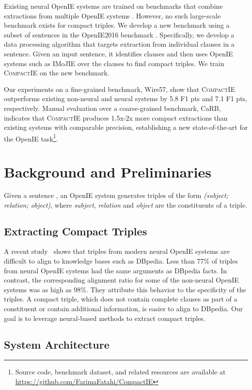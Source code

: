 \documentclass[11pt,a4paper]{article}
\newcommand{\system}{{\textsc{CompactIE}}}
\begin{document}
Existing neural OpenIE systems are trained on benchmarks that combine extractions from multiple OpenIE systems .
However, no such large-scale benchmark exists for compact triples. We develop a new benchmark using a subset of sentences in the OpenIE2016 benchmark \cite{openie4}. Specifically, we develop a data processing algorithm that targets extraction from individual clauses in a sentence. Given an input sentence, it identifies clauses and then uses OpenIE systems such as IMoJIE over the clauses to find compact triples. We train \system{} on the new benchmark.

Our experiments on a fine-grained benchmark, Wire57, show that \system{} outperforms existing non-neural and neural systems by 5.8 F1 pts and 7.1 F1 pts,
respectively. Manual evaluation over a coarse-grained benchmark, CaRB, indicates that \system{} produces 1.5x-2x more compact extractions than existing systems with comparable precision, establishing a new state-of-the-art for the OpenIE task\footnote{Source code, benchmark dataset, and related resources are available at \url{https://github.com/FarimaFatahi/CompactIE}}.

\section{Background and Preliminaries}
\label{'task'}
Given a sentence , an OpenIE system generates triples of the form \emph{(subject; relation; object)}, where \emph{subject}, \emph{relation} and \emph{object} are the constituents of a triple. 

\subsection{Extracting Compact Triples}

A recent study~\cite{gashteovski2020aligning} shows that triples from modern neural OpenIE systems are difficult to align to knowledge bases such as DBpedia. Less than 77\% of triples from neural OpenIE systems had the same arguments as DBpedia facts. In contrast, the corresponding alignment ratio for some of the non-neural OpenIE systems was as high as 98\%. They attribute this behavior to the specificity of the triples. A compact triple, which does not contain complete clauses as part of a constituent or contain additional information, is easier to align to DBpedia. {Our goal is to leverage neural-based methods to extract compact triples.}

\subsection{System Architecture}
\end{document}
